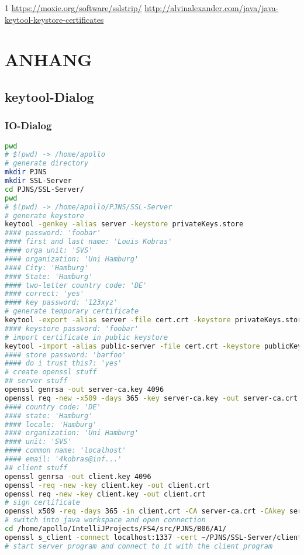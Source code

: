 \documentclass[twoside]{article}
\begin{document}
\begin{thebibliography}{1}
	\url{https://moxie.org/software/sslstrip/}
	\url{http://alvinalexander.com/java/java-keytool-keystore-certificates}
\end{thebibliography}

\newpage
\section*{ANHANG}
	\label{sec:anhang}
	\subsection*{keytool-Dialog}
		\label{keytool-dialog}
		\subsubsection*{IO-Dialog}
		\begin{lstlisting}[language=Bash]
pwd
# $(pwd) -> /home/apollo
# generate directory
mkdir PJNS
mkdir SSL-Server
cd PJNS/SSL-Server/
pwd
# $(pwd) -> /home/apollo/PJNS/SSL-Server
# generate keystore
keytool -genkey -alias server -keystore privateKeys.store
#### password: 'foobar'
#### first and last name: 'Louis Kobras'
#### orga unit: 'SVS'
#### organization: 'Uni Hamburg'
#### City: 'Hamburg'
#### State: 'Hamburg'
#### two-letter country code: 'DE'
#### correct: 'yes'
#### key password: '123xyz'
# generate temporary certificate
keytool -export -alias server -file cert.crt -keystore privateKeys.store 
#### keystore password: 'foobar'
# import certificate in public keystore
keytool -import -alias public-server -file cert.crt -keystore publicKeys.store
#### store password: 'barfoo'
#### do i trust this?: 'yes'
# create openssl stuff
## server stuff
openssl genrsa -out server-ca.key 4096
openssl req -new -x509 -days 365 -key server-ca.key -out server-ca.crt
#### country code: 'DE'
#### state: 'Hamburg'
#### locale: 'Hamburg'
#### organization: 'Uni Hamburg'
#### unit: 'SVS'
#### common name: 'localhost'
#### email: '4kobras@inf...'
## client stuff
openssl genrsa -out client.key 4096
openssl -req -new -key client.key -out client.crt
openssl req -new -key client.key -out client.crt
# sign certificate
openssl x509 -req -days 365 -in client.crt -CA server-ca.crt -CAkey server-ca.key -set_serial 01 -out client-cert.crt
# switch into java workspace and open connection
cd /home/apollo/IntelliJProjects/FS4/src/PJNS/B06/A1/
openssl s_client -connect localhost:1337 -cert ~/PJNS/SSL-Server/client-cert.crt -key ~/PJNS/SSL-Server/client.key -CAfile ~/PJNS/SSL-Server/server-ca.crt
# start server program and connect to it with the client program
		\end{lstlisting}
\end{document}
